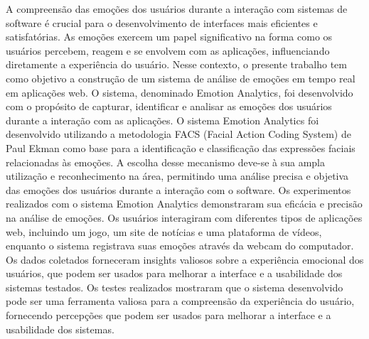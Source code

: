 \begin{resumo-portugues}
  
  A compreensão das emoções dos usuários durante a interação com sistemas de software é crucial para o desenvolvimento de interfaces mais eficientes e satisfatórias. As emoções exercem um papel significativo na forma como os usuários percebem, reagem e se envolvem com as aplicações, influenciando diretamente a experiência do usuário. Nesse contexto, o presente trabalho tem como objetivo a construção de um sistema de análise de emoções em tempo real em aplicações web. O sistema, denominado Emotion Analytics, foi desenvolvido com o propósito de capturar, identificar e analisar as emoções dos usuários durante a interação com as aplicações. O sistema Emotion Analytics foi desenvolvido utilizando a metodologia FACS (Facial Action Coding System) de Paul Ekman como base para a identificação e classificação das expressões faciais relacionadas às emoções. A escolha desse mecanismo deve-se à sua ampla utilização e reconhecimento na área, permitindo uma análise precisa e objetiva das emoções dos usuários durante a interação com o software. Os experimentos realizados com o sistema Emotion Analytics demonstraram sua eficácia e precisão na análise de emoções. Os usuários interagiram com diferentes tipos de aplicações web, incluindo um jogo, um site de notícias e uma plataforma de vídeos, enquanto o sistema registrava suas emoções através da webcam do computador. Os dados coletados forneceram insights valiosos sobre a experiência emocional dos usuários, que podem ser usados para melhorar a interface e a usabilidade dos sistemas testados. Os testes realizados mostraram que o sistema desenvolvido pode ser uma ferramenta valiosa para a compreensão da experiência do usuário, fornecendo percepções que podem ser usados para melhorar a interface e a usabilidade dos sistemas.


\end{resumo-portugues}
